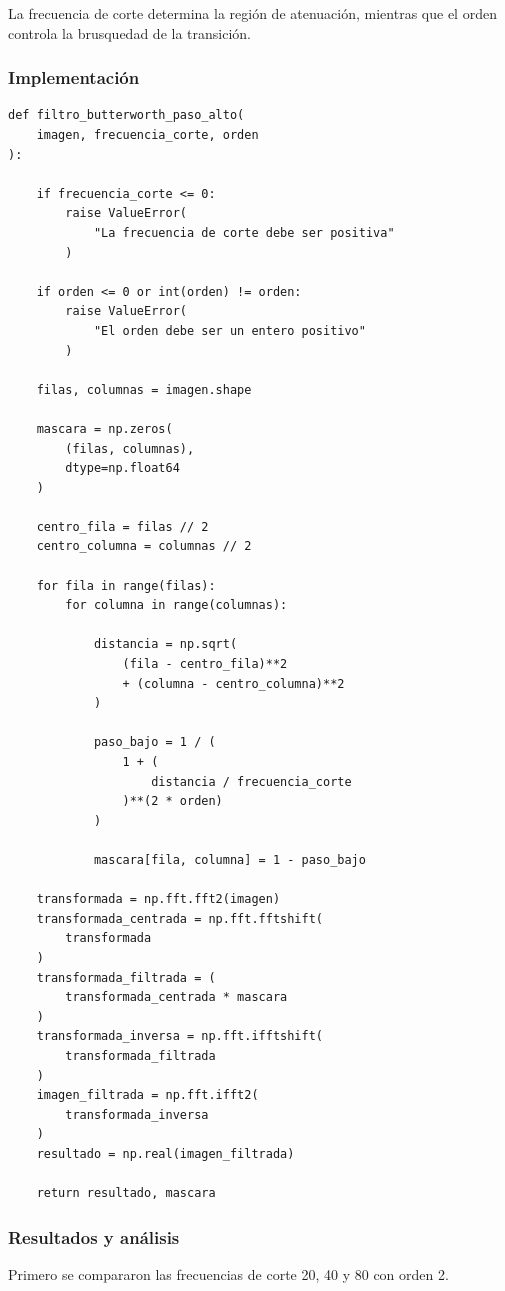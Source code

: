 \documentclass[11pt,letterpaper]{article}
\begin{document}
La frecuencia de corte determina
la región de atenuación, mientras que
el orden controla la brusquedad
de la transición.

\subsubsection*{Implementación}

\begin{lstlisting}
def filtro_butterworth_paso_alto(
    imagen, frecuencia_corte, orden
):

    if frecuencia_corte <= 0:
        raise ValueError(
            "La frecuencia de corte debe ser positiva"
        )

    if orden <= 0 or int(orden) != orden:
        raise ValueError(
            "El orden debe ser un entero positivo"
        )

    filas, columnas = imagen.shape

    mascara = np.zeros(
        (filas, columnas),
        dtype=np.float64
    )

    centro_fila = filas // 2
    centro_columna = columnas // 2

    for fila in range(filas):
        for columna in range(columnas):

            distancia = np.sqrt(
                (fila - centro_fila)**2
                + (columna - centro_columna)**2
            )

            paso_bajo = 1 / (
                1 + (
                    distancia / frecuencia_corte
                )**(2 * orden)
            )

            mascara[fila, columna] = 1 - paso_bajo

    transformada = np.fft.fft2(imagen)
    transformada_centrada = np.fft.fftshift(
        transformada
    )
    transformada_filtrada = (
        transformada_centrada * mascara
    )
    transformada_inversa = np.fft.ifftshift(
        transformada_filtrada
    )
    imagen_filtrada = np.fft.ifft2(
        transformada_inversa
    )
    resultado = np.real(imagen_filtrada)

    return resultado, mascara
\end{lstlisting}

\subsubsection*{Resultados y análisis}

Primero se compararon las frecuencias
de corte 20, 40 y 80 con orden 2.
\end{document}
